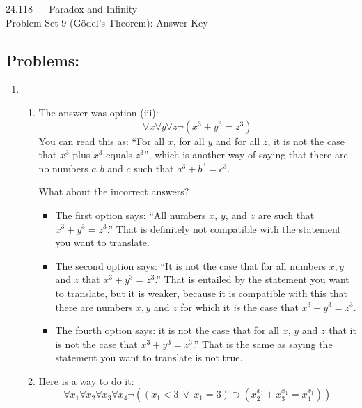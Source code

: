 \documentclass[12pt,a4paper]{article}
\begin{document}
\begin{center} {\large 24.118 --- Paradox and Infinity \\ \vspace{1mm}}
 {\large Problem Set 9 (G\"odel's Theorem): Answer Key \\ \vspace{1mm}}
 
\end{center}
\vspace{3mm}


\subsection*{Problems:}

\begin{enumerate}
\item \begin{enumerate}
	\item The answer was option (iii): $$\forall x \forall y \forall z \neg(x^3 + y^3 = z^3)$$ You can read this as: ``For all $x$, for all $y$ and for all $z$, it is not the case that $x^3$ plus $x^3$ equals $z^3$'', which is another way of saying that there are no numbers $a$ $b$ and $c$ such that $a^3 + b^3 = c^3$.
	
	What about the incorrect answers?
	\begin{itemize}
	\item The first option says: ``All numbers $x$, $y$, and $z$ are such that $x^3 + y^3 = z^3$.'' That is definitely not compatible with the statement you want to translate.
	\item The second option says: ``It is not the case that for all numbers $x, y$ and $z$ that $x^3 + y^3 = z^3$.'' That is entailed by the statement you want to translate, but it is weaker, because it is compatible with this that there are numbers $x, y$ and $z$ for which it \emph{is} the case that $x^3 + y^3 = z^3$.
	\item The fourth option says: it is not the case that for all $x$, $y$ and $z$ that it is not the case that $x^3 + y^3 = z^3$.'' That is the same as saying the statement you want to translate is not true.
	\end{itemize}
	
	\item Here is a way to do it: $$\forall x_1 \forall x_2 \forall x_3 \forall x_4 \neg((x_1 < 3 \ \vee \ x_1=3) \supset (x_2^{x_1} + x_3^{x_1} = x_4^{x_1}))$$
	\end{enumerate}


\end{enumerate}
\end{document}
